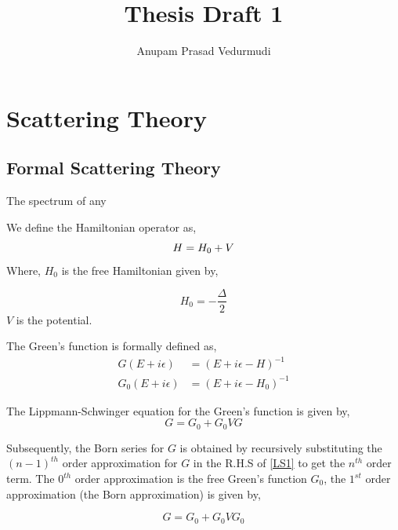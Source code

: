 \documentclass[a4paper,10pt]{report}
\title{Thesis Draft 1}
\author{Anupam Prasad Vedurmudi}
\begin{document}
\maketitle

\begin{abstract}
 
\end{abstract}

\section{Scattering Theory}

\subsection{Formal Scattering Theory}
The spectrum of any 

We define the Hamiltonian operator as,
\begin{equation}
 H = H_0+V\\
\end{equation}
\noindent Where, $H_0$ is the free Hamiltonian given by, 

\begin{equation}
 H_0=-\frac{\Delta}{2}
\end{equation}
\noindent $V$ is the potential.

\noindent The Green's function is formally defined as,
\begin{eqnarray}\label{GFdefinition}
 G\left(E+i\epsilon\right) &=\left(E+i\epsilon-H\right)^{-1}\\
 G_0\left(E+i\epsilon\right) &=\left(E+i\epsilon-H_0\right)^{-1}
\end{eqnarray}

\noindent The Lippmann-Schwinger equation for the Green's function is given by,
\begin{equation}\label{LS1}
 G=G_0+G_0VG
\end{equation}

\noindent Subsequently, the Born series for $G$ is obtained by recursively substituting
the $(n-1)^{th}$ order approximation for $G$ in the R.H.S of \eqref{LS1} to get the $n^{th}$
order term. The $0^{th}$ order approximation is the free Green's function $G_0$, the $1^{st}$
order approximation (the Born approximation) is given by,

\begin{equation}\label{BornApproximation}
 G=G_0+G_0VG_0
\end{equation}
\end{document}
